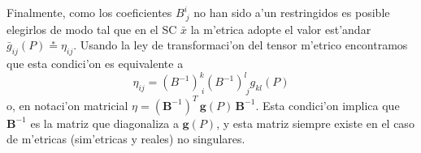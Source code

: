 Finalmente, como los coeficientes $B^i_{\ j}$ no han sido a'un restringidos es posible elegirlos de modo tal que en el SC $\bar{x}$ la m'etrica adopte el valor est'andar $\bar{g}_{ij}(P)\stackrel{*}{=}\eta_{ij}$. Usando la ley de transformaci'on del tensor m'etrico encontramos que esta condici'on es equivalente a
\begin{equation}
\eta_{ij}=(B^{-1})^k_{\ i}(B^{-1})^l_{\ j}g_{kl}(P)
\end{equation}
o, en notaci'on matricial $\eta=(\mathbf{B}^{-1})^T\,\mathbf{g}(P)\,\mathbf{B}^{-1}$.
Esta condici'on implica que $\mathbf{B}^{-1}$ es la matriz que diagonaliza a $\mathbf{g}(P)$, y esta matriz siempre existe en el caso de m'etricas (sim'etricas y reales) no singulares.
%
%
%
